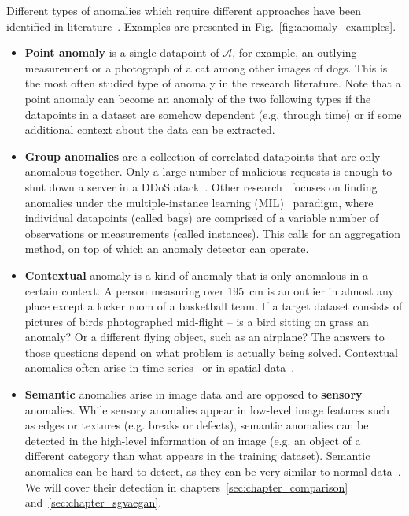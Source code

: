 Different types of anomalies which require different approaches have been identified in literature~\cite{chandola2009anomaly,ruff2020unifying}. Examples are presented in Fig.~\ref{fig:anomaly_examples}.
\begin{itemize}
	\item \textbf{Point anomaly} is a single datapoint of $\mathcal{A}$, for example, an outlying measurement or a photograph of a cat among other images of dogs. This is the most often studied type of anomaly in the research literature. Note that a point anomaly can become an anomaly of the two following types if the datapoints in a dataset are somehow dependent (e.g. through time) or if some additional context about the data can be extracted.

	\item \textbf{Group anomalies} are a collection of correlated datapoints that are only anomalous together. Only a large number of malicious requests is enough to shut down a server in a DDoS atack~\cite{ahmed2018collective}. Other research~\cite{quellec2016multiple,wan2020weakly} focuses on finding anomalies under the multiple-instance learning (MIL)~\cite{carbonneau2018multiple} paradigm, where individual datapoints (called bags) are comprised of a variable number of observations or measurements (called instances). This calls for an aggregation method, on top of which an anomaly detector can operate.

	\item \textbf{Contextual} anomaly is a kind of anomaly that is only anomalous in a certain context. A person measuring over 195~cm is an outlier in almost any place except a locker room of a basketball team. If a target dataset consists of pictures of birds photographed mid-flight -- is a bird sitting on grass an anomaly? Or a different flying object, such as an airplane? The answers to those questions depend on what problem is actually being solved. Contextual anomalies often arise in time series~\cite{tsay2000outliers} or in spatial data~\cite{chawla2006slom}.

	\item \textbf{Semantic} anomalies arise in image data and are opposed to \textbf{sensory} anomalies. While sensory anomalies appear in low-level image features such as edges or textures (e.g. breaks or defects), semantic anomalies can be detected in the high-level information of an image (e.g. an object of a different category than what appears in the  training dataset). Semantic anomalies can be hard to detect, as they can be very similar to normal data~\cite{ahmed2020detecting}. We will cover their detection in chapters~\ref{sec:chapter_comparison} and~\ref{sec:chapter_sgvaegan}.
\end{itemize}

